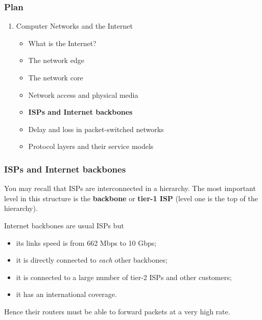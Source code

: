 
%
\begin{frame}
\frametitle{Plan}

\begin{enumerate}

  \item Computer Networks and the Internet

    \begin{itemize}

      \item What is the Internet?

      \item The network edge

      \item The network core

      \item Network access and physical media

      \item \textbf{ISPs and Internet backbones}

      \item Delay and loss in packet-switched networks
 
      \item Protocol layers and their service models

    \end{itemize}

\end{enumerate}

\end{frame}

%
\begin{frame}
\frametitle{ISPs and Internet backbones}

You may recall that ISPs are interconnected in a hierarchy. The most
important level in this structure is the \textbf{backbone} or
\textbf{tier-1 ISP} (level one is the top of the hierarchy).

\bigskip

Internet backbones are usual ISPs but
\begin{itemize}

  \item its links speed is from 662 Mbps to 10 Gbps;

  \item it is directly connected to \emph{each} other backbones;

  \item it is connected to a large number of tier-2 ISPs and other
  customers; 

  \item it has an international coverage.

\end{itemize}
Hence their routers must be able to forward packets at a very high
rate.

\end{frame}

